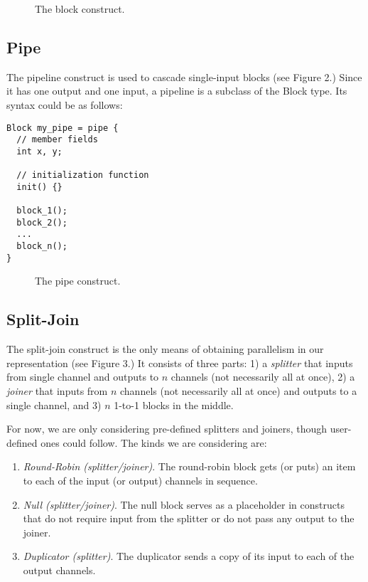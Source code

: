 \begin{figure}[t]
\centerline{}
\vspace{-24pt}
\caption{\protect\small The block construct.}
\end{figure}

\subsection{Pipe}

The pipeline construct is used to cascade single-input blocks (see
Figure 2.)  Since it has one output and one input, a pipeline is a
subclass of the Block type. Its syntax could be as follows:

\begin{verbatim}
Block my_pipe = pipe {
  // member fields
  int x, y;

  // initialization function
  init() {}

  block_1();
  block_2();
  ...
  block_n();
}
\end{verbatim}

\begin{figure}[t]
\centerline{}
\vspace{-24pt}
\caption{\protect\small The pipe construct.}
\end{figure}

\subsection{Split-Join}

The split-join construct is the only means of obtaining parallelism in
our representation (see Figure 3.)  It consists of three parts: 1) a
{\em splitter} that inputs from single channel and outputs to $n$
channels (not necessarily all at once), 2) a {\em joiner} that inputs
from $n$ channels (not necessarily all at once) and outputs to a single
channel, and 3) $n$ 1-to-1 blocks in the middle.

For now, we are only considering pre-defined splitters and joiners,
though user-defined ones could follow.  The kinds we are considering
are:

\begin{enumerate}

\item {\em Round-Robin (splitter/joiner)}.  The round-robin block gets
(or puts) an item to each of the input (or output) channels in sequence.

\item {\em Null (splitter/joiner)}.  The null block serves as a
placeholder in constructs that do not require input from the splitter or
do not pass any output to the joiner.

\item {\em Duplicator (splitter)}.  The duplicator sends a copy of its
input to each of the output channels.

\end{enumerate}

